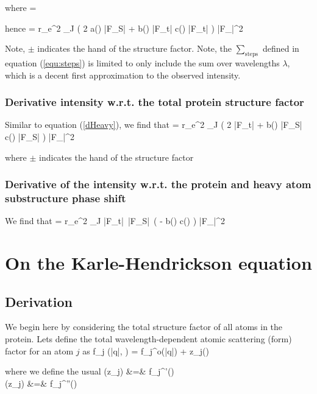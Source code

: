 \documentclass[dists.tex]{subfiles}
\begin{document}
where
\be
{} = 
\ee

hence
\be \label{dHeavy}
 = r_e^2 \kappa \sum_\lambda   J \big(  2 a(\lambda) |F_S| + b(\lambda) |F_t| \cos \alpha \pm c(\lambda) |F_t| \sin \alpha \big) |F_|^2 \Delta\Omega
\ee

Note, $\pm$ indicates the hand of the structure factor. Note, the $\sum_\text{steps}$ defined in  equation (\ref{equ:steps}) is limited to only include the sum over wavelengths $\lambda$, which is a decent first approximation to the observed intensity. 

\subsubsection{Derivative intensity w.r.t. the total protein structure factor}
Similar to equation (\ref{dHeavy}), we find that 
\be \label{dTotal}
 = r_e^2 \kappa \sum_\lambda   J \big(  2 |F_t| + b(\lambda) |F_S| \cos \alpha \pm c(\lambda) |F_S| \sin \alpha \big) |F_|^2 \Delta\Omega
\ee

where $\pm$ indicates the hand of the structure factor

\subsubsection{Derivative of the intensity w.r.t. the protein and heavy atom substructure phase shift} \label{section:derive}
We find that 
\be \label{dAlpha}
 = r_e^2 \kappa \sum_\lambda   J |F_t|\, |F_S| \,\big( - b(\lambda) \sin \alpha \pm c(\lambda) \cos \alpha \big) |F_|^2 \Delta\Omega
\ee

\section{On the Karle-Hendrickson equation}
\subsection{Derivation}
We begin here by considering the total structure factor of all atoms in the protein. Lets define the total wavelength-dependent atomic scattering (form) factor for an atom $j$ as 
\be
\widetilde f_j (|q|, \lambda) = f_j^o(|q|) +  \widetilde z_j(\lambda)
\ee

where we define the usual 
\beq \label{zparts}
\Re (\widetilde z_j) &=& f_j^{'}(\lambda) \\ \nonumber
\Im (\widetilde z_j) &=& f_j^{''}(\lambda)
\eeq 
\end{document}
